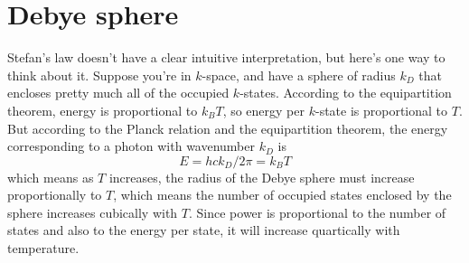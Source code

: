 \documentclass[12pt]{article}
\begin{document}
\section{Debye sphere}
Stefan's law doesn't have a clear intuitive interpretation, but here's one way to think about it. Suppose you're in $k$-space, and have a sphere of radius $k_D$ that encloses pretty much all of the occupied $k$-states. According to the equipartition theorem, energy is proportional to $k_B T$, so energy per $k$-state is proportional to $T$. But according to the Planck relation and the equipartition theorem, the energy corresponding to a photon with wavenumber $k_D$ is
\[ E = h c k_D / 2 \pi = k_B T \]
which means as $T$ increases, the radius of the Debye sphere must increase proportionally to $T$, which means the number of occupied states enclosed by the sphere increases cubically with $T$. Since power is proportional to the number of states and also to the energy per state, it will increase quartically with temperature.
\end{document}
